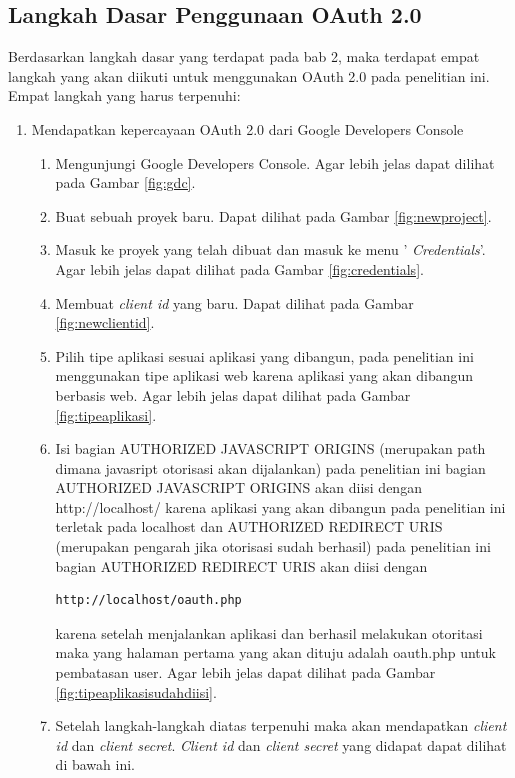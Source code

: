 \subsection{Langkah Dasar Penggunaan OAuth 2.0}
Berdasarkan langkah dasar yang terdapat pada bab 2, maka terdapat empat langkah yang akan diikuti untuk menggunakan OAuth 2.0 pada penelitian ini. Empat langkah yang harus terpenuhi:
\begin{enumerate}[(1)]
\item Mendapatkan kepercayaan OAuth 2.0 dari Google Developers Console\\
    \begin{enumerate}
    \item Mengunjungi Google Developers Console. Agar lebih jelas dapat dilihat pada Gambar \ref{fig:gdc}.
    \item Buat sebuah proyek baru. Dapat dilihat pada Gambar \ref{fig:newproject}.
    \item Masuk ke proyek yang telah dibuat dan masuk ke menu '{\it
    Credentials}'. Agar lebih jelas dapat dilihat pada Gambar \ref{fig:credentials}.
    \item Membuat {\it client id} yang baru. Dapat dilihat pada Gambar \ref{fig:newclientid}.
    \item Pilih tipe aplikasi sesuai aplikasi yang dibangun, pada penelitian ini menggunakan tipe aplikasi web karena aplikasi yang akan dibangun berbasis web. Agar lebih jelas dapat dilihat pada Gambar \ref{fig:tipeaplikasi}.
    \item Isi bagian AUTHORIZED JAVASCRIPT ORIGINS (merupakan path dimana javasript otorisasi akan dijalankan) pada penelitian ini bagian AUTHORIZED JAVASCRIPT ORIGINS akan diisi dengan http://localhost/ karena aplikasi yang akan dibangun pada penelitian ini terletak pada localhost dan AUTHORIZED REDIRECT URIS (merupakan pengarah jika otorisasi sudah berhasil) pada penelitian ini bagian AUTHORIZED REDIRECT URIS akan diisi dengan
    \begin{lstlisting}[basicstyle=\footnotesize]
http://localhost/oauth.php
    \end{lstlisting}
    karena setelah menjalankan aplikasi dan berhasil melakukan otoritasi maka yang halaman pertama yang akan dituju adalah oauth.php untuk pembatasan user. Agar lebih jelas dapat dilihat pada Gambar \ref{fig:tipeaplikasisudahdiisi}.
    \item Setelah langkah-langkah diatas terpenuhi maka akan mendapatkan {\it client id} dan {\it client secret}. {\it Client id} dan {\it client secret} yang didapat dapat dilihat di bawah ini.

\end{enumerate}
\end{enumerate}
